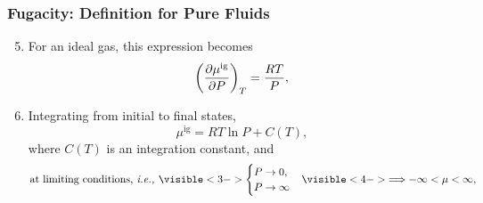 \documentclass[10pt,compress,unknownkeysallowed]{beamer}
\begin{document}
\begin{frame}
  \frametitle{Fugacity: Definition for Pure Fluids}
        \begin{enumerate}\setcounter{enumi}{4}  
           \item<1-> For an ideal gas, this expression becomes
              \begin{displaymath}
                 \Partial[\mu^{\text{ig}}]{P}{T} = \frc{RT}{P}, 
              \end{displaymath}
              
           \item<2-> Integrating from initial to final states,
              \begin{displaymath}
                \mu^{\text{ig}} = RT\ln{P} + C(T), 
              \end{displaymath}
              where $C(T)$ is an integration constant, and
              \begin{displaymath}
                \text{at limiting conditions, \ie }
                \visible<3->{\begin{cases}
                  P\rightarrow 0, & \\
                  P\rightarrow \infty &
                \end{cases}}
                \visible<4->{\Longrightarrow -\infty < \mu < \infty,}
              \end{displaymath}               
        \end{enumerate}
\end{frame}
\normalsize
\end{document}
